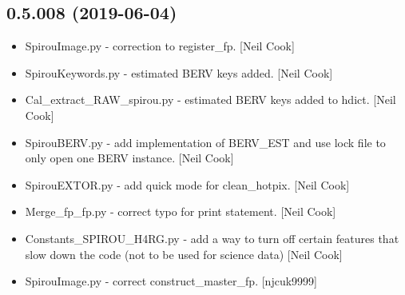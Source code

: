 \documentclass[a4paper,10pt,english]{report}
\begin{document}
\subsection{0.5.008 (2019-06-04)}
\label{\detokenize{misc/changelog:id127}}\begin{itemize}
\item {} 
SpirouImage.py - correction to register\_fp. {[}Neil Cook{]}

\item {} 
SpirouKeywords.py - estimated BERV keys added. {[}Neil Cook{]}

\item {} 
Cal\_extract\_RAW\_spirou.py - estimated BERV keys added to hdict. {[}Neil
Cook{]}

\item {} 
SpirouBERV.py - add implementation of BERV\_EST and use lock file to
only open one BERV instance. {[}Neil Cook{]}

\item {} 
SpirouEXTOR.py - add quick mode for clean\_hotpix. {[}Neil Cook{]}

\item {} 
Merge\_fp\_fp.py - correct typo for print statement. {[}Neil Cook{]}

\item {} 
Constants\_SPIROU\_H4RG.py - add a way to turn off certain features that
slow down the code (not to be used for science data) {[}Neil Cook{]}

\item {} 
SpirouImage.py - correct construct\_master\_fp. {[}njcuk9999{]}

\end{itemize}
\end{document}
